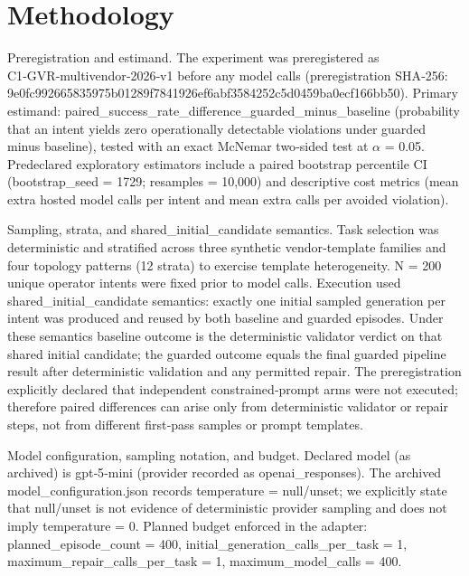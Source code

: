 \documentclass[conference]{IEEEtran}
\begin{document}
\section{Methodology}
Preregistration and estimand. The experiment was preregistered as C1‑GVR‑multivendor‑2026‑v1 before any model calls (preregistration SHA‑256: 9e0fc992\allowbreak{}66583597\allowbreak{}5b01289f\allowbreak{}7841926e\allowbreak{}f6abf358\allowbreak{}4252c5d0\allowbreak{}459ba0ec\allowbreak{}f166bb50). Primary estimand: paired\_success\_rate\_difference\_guarded\_minus\_baseline (probability that an intent yields zero operationally detectable violations under guarded minus baseline), tested with an exact McNemar two‑sided test at \ensuremath{\alpha} = 0.05. Predeclared exploratory estimators include a paired bootstrap percentile CI (bootstrap\_seed = 1729; resamples = 10,000) and descriptive cost metrics (mean extra hosted model calls per intent and mean extra calls per avoided violation).

Sampling, strata, and shared\_initial\_candidate semantics. Task selection was deterministic and stratified across three synthetic vendor‑template families and four topology patterns (12 strata) to exercise template heterogeneity. N = 200 unique operator intents were fixed prior to model calls. Execution used shared\_initial\_candidate semantics: exactly one initial sampled generation per intent was produced and reused by both baseline and guarded episodes. Under these semantics baseline outcome is the deterministic validator verdict on that shared initial candidate; the guarded outcome equals the final guarded pipeline result after deterministic validation and any permitted repair. The preregistration explicitly declared that independent constrained‑prompt arms were not executed; therefore paired differences can arise only from deterministic validator or repair steps, not from different first‑pass samples or prompt templates.

Model configuration, sampling notation, and budget. Declared model (as archived) is gpt‑5‑mini (provider recorded as openai\_responses). The archived model\_configuration.json records temperature = null/unset; we explicitly state that null/unset is not evidence of deterministic provider sampling and does not imply temperature = 0. Planned budget enforced in the adapter: planned\_episode\_count = 400, initial\_generation\_calls\_per\_task = 1, maximum\_repair\_calls\_per\_task = 1, maximum\_model\_calls = 400.
\end{document}
